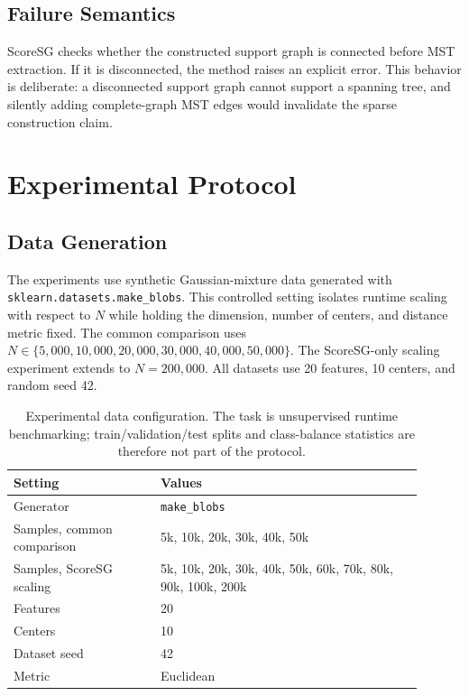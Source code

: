 \documentclass[11pt]{article}
\begin{document}
\subsection{Failure Semantics}

ScoreSG checks whether the constructed support graph is connected before MST extraction. If it is disconnected, the method raises an explicit error. This behavior is deliberate: a disconnected support graph cannot support a spanning tree, and silently adding complete-graph MST edges would invalidate the sparse construction claim.

\section{Experimental Protocol}

\subsection{Data Generation}

The experiments use synthetic Gaussian-mixture data generated with \texttt{sklearn.datasets.make\_blobs}. This controlled setting isolates runtime scaling with respect to \(N\) while holding the dimension, number of centers, and distance metric fixed. The common comparison uses \(N \in \{5{,}000,10{,}000,20{,}000,30{,}000,40{,}000,50{,}000\}\). The ScoreSG-only scaling experiment extends to \(N=200{,}000\). All datasets use 20 features, 10 centers, and random seed 42.

\begin{table}[t]
\centering
\caption{Experimental data configuration. The task is unsupervised runtime benchmarking; train/validation/test splits and class-balance statistics are therefore not part of the protocol.}
\label{tab:data}
\begin{tabular}{p{0.32\linewidth}p{0.58\linewidth}}
\toprule
Setting & Values \\
\midrule
Generator & \texttt{make\_blobs} \\
Samples, common comparison & 5k, 10k, 20k, 30k, 40k, 50k \\
Samples, ScoreSG scaling & 5k, 10k, 20k, 30k, 40k, 50k, 60k, 70k, 80k, 90k, 100k, 200k \\
Features & 20 \\
Centers & 10 \\
Dataset seed & 42 \\
Metric & Euclidean \\
\bottomrule
\end{tabular}
\end{table}
\end{document}
